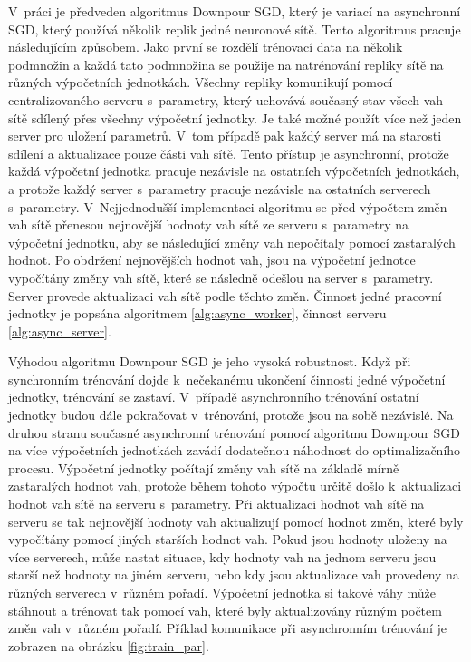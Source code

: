 V~práci \cite{Dean2012} je předveden algoritmus Downpour SGD, který je variací na asynchronní SGD, který používá několik replik jedné neuronové sítě.
Tento algoritmus pracuje následujícím způsobem.
Jako první se rozdělí trénovací data na několik podmnožin a každá tato podmnožina se použije na natrénování repliky sítě na různých výpočetních jednotkách.
Všechny repliky komunikují pomocí centralizovaného serveru s~parametry, který uchovává současný stav všech vah sítě sdílený přes všechny výpočetní jednotky.
Je také možné použít více než jeden server pro uložení parametrů.
V~tom případě pak každý server má na starosti sdílení a aktualizace pouze části vah sítě.
Tento přístup je asynchronní, protože každá výpočetní jednotka pracuje nezávisle na ostatních výpočetních jednotkách, a protože každý server s~parametry pracuje nezávisle na ostatních serverech s~parametry.
V~Nejjednodušší implementaci algoritmu se před výpočtem změn vah sítě přenesou nejnovější hodnoty vah sítě ze serveru s~parametry na výpočetní jednotku, aby se následující změny vah nepočítaly pomocí zastaralých hodnot.
Po obdržení nejnovějších hodnot vah, jsou na výpočetní jednotce vypočítány změny vah sítě, které se následně odešlou na server s~parametry.
Server provede aktualizaci vah sítě podle těchto změn.
Činnost jedné pracovní jednotky je popsána algoritmem \ref{alg:async_worker}, činnost serveru \ref{alg:async_server}.

Výhodou algoritmu Downpour SGD je jeho vysoká robustnost.
Když při synchronním trénování dojde k~nečekanému ukončení činnosti jedné výpočetní jednotky, trénování se zastaví.
V~případě asynchronního trénování ostatní jednotky budou dále pokračovat v~trénování, protože jsou na sobě nezávislé.
Na druhou stranu současné asynchronní trénování pomocí algoritmu Downpour SGD na více výpočetních jednotkách zavádí dodatečnou náhodnost do optimalizačního procesu.
Výpočetní jednotky počítají změny vah sítě na základě mírně zastaralých hodnot vah, protože během tohoto výpočtu určitě došlo k~aktualizaci hodnot vah sítě na serveru s~parametry.
Při aktualizaci hodnot vah sítě na serveru se tak nejnovější hodnoty vah aktualizují pomocí hodnot změn, které byly vypočítány pomocí jiných starších hodnot vah.
Pokud jsou hodnoty uloženy na více serverech, může nastat situace, kdy hodnoty vah na jednom serveru jsou starší než hodnoty na jiném serveru, nebo kdy jsou aktualizace vah provedeny na různých serverech v~různém pořadí.
Výpočetní jednotka si takové váhy může stáhnout a trénovat tak pomocí vah, které byly aktualizovány různým počtem změn vah v~různém pořadí.
Příklad komunikace při asynchronním trénování je zobrazen na obrázku \ref{fig:train_par}.


